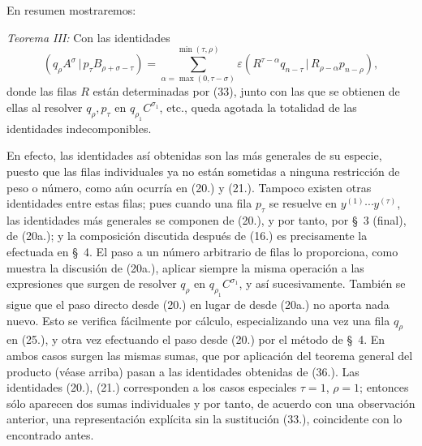 \documentclass[11pt]{article}
\newcommand{\pair}[2]{(#1\,|\,#2)}
\newcommand{\eps}{\varepsilon}
\begin{document}
En resumen mostraremos:

\emph{Teorema III:} Con las identidades
\begin{equation}
 \pair{q_\rho A^\sigma}{p_\tau B_{\rho+\sigma-\tau}}
 =\sum_{\alpha=\max(0,\tau-\sigma)}^{\min(\tau,\rho)}
 \eps\pair{R^{\tau-\alpha}q_{n-\tau}}{R_{\rho-\alpha}p_{n-\rho}},
\tag{36}
\end{equation}
donde las filas $R$ están determinadas por (33), junto con las que se obtienen de ellas al resolver $q_\rho,p_\tau$ en $q_{\rho_1}C^{\sigma_1}$, etc., queda agotada la totalidad de las identidades indecomponibles.

En efecto, las identidades así obtenidas son las más generales de su especie, puesto que las filas individuales ya no están sometidas a ninguna restricción de peso o número, como aún ocurría en (20.) y (21.). Tampoco existen otras identidades entre estas filas; pues cuando una fila $p_\tau$ se resuelve en $y^{(1)}\cdots y^{(\tau)}$, las identidades más generales se componen de (20.), y por tanto, por \S\ 3 (final), de (20a.); y la composición discutida después de (16.) es precisamente la efectuada en \S\ 4. El paso a un número arbitrario de filas lo proporciona, como muestra la discusión de (20a.), aplicar siempre la misma operación a las expresiones que surgen de resolver $q_\rho$ en $q_{\rho_1}C^{\sigma_1}$, y así sucesivamente. También se sigue que el paso directo desde (20.) en lugar de desde (20a.) no aporta nada nuevo. Esto se verifica fácilmente por cálculo, especializando una vez una fila $q_\rho$ en (25.), y otra vez efectuando el paso desde (20.) por el método de \S\ 4. En ambos casos surgen las mismas sumas, que por aplicación del teorema general del producto (véase arriba) pasan a las identidades obtenidas de (36.). Las identidades (20.), (21.) corresponden a los casos especiales $\tau=1$, $\rho=1$; entonces sólo aparecen dos sumas individuales y por tanto, de acuerdo con una observación anterior, una representación explícita sin la sustitución (33.), coincidente con lo encontrado antes.
\end{document}
